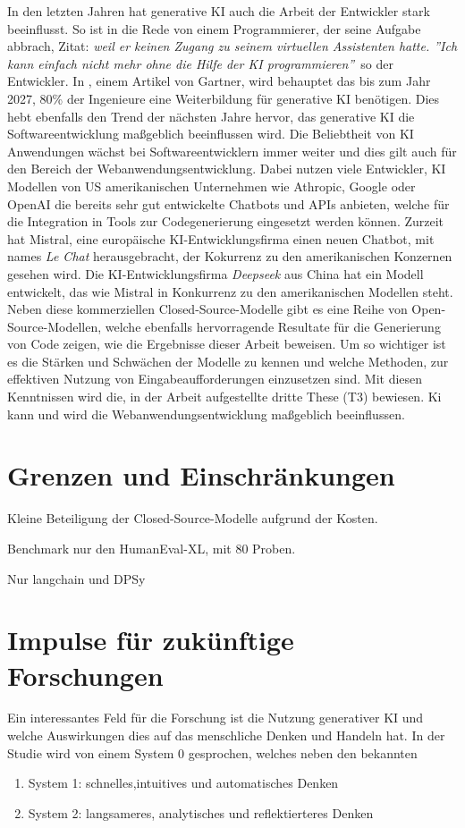 In den letzten Jahren hat generative KI auch die Arbeit der Entwickler stark beeinflusst. So ist in \cite{focus-online-2025} die Rede von einem Programmierer, der seine Aufgabe abbrach, Zitat: \glqq \textit{weil er keinen Zugang zu seinem virtuellen Assistenten hatte. ''Ich kann einfach nicht mehr ohne die Hilfe der KI programmieren''}\grqq \ so der Entwickler. In \cite{company_gartner_2024}, einem Artikel von Gartner, wird behauptet das bis zum Jahr 2027, 80\% der Ingenieure eine Weiterbildung für generative KI benötigen. Dies hebt ebenfalls den Trend der nächsten Jahre hervor, das generative KI die Softwareentwicklung maßgeblich beeinflussen wird.
Die Beliebtheit von KI Anwendungen wächst bei Softwareentwicklern immer weiter und dies gilt auch für den Bereich der Webanwendungsentwicklung. Dabei nutzen viele Entwickler, KI Modellen von US amerikanischen Unternehmen wie Athropic, Google oder OpenAI die bereits sehr gut entwickelte Chatbots und APIs anbieten, welche für die Integration in Tools zur Codegenerierung eingesetzt werden können. Zurzeit hat Mistral, eine europäische KI-Entwicklungsfirma einen neuen Chatbot, mit names \textit{Le Chat} herausgebracht, der Kokurrenz zu den amerikanischen Konzernen gesehen wird. Die KI-Entwicklungsfirma \textit{Deepseek} aus China hat ein Modell entwickelt, das wie Mistral in Konkurrenz zu den amerikanischen Modellen steht. Neben diese kommerziellen Closed-Source-Modelle gibt es eine Reihe von Open-Source-Modellen, welche ebenfalls hervorragende Resultate für die Generierung von Code zeigen, wie die Ergebnisse dieser Arbeit beweisen. Um so wichtiger ist es die Stärken und Schwächen der Modelle zu kennen und welche Methoden, zur effektiven Nutzung von Eingabeaufforderungen einzusetzen sind. Mit diesen Kenntnissen wird die, in der Arbeit aufgestellte dritte These (T3) bewiesen. Ki kann und wird die Webanwendungsentwicklung maßgeblich beeinflussen. 

\section{Grenzen und Einschränkungen}
Kleine Beteiligung der Closed-Source-Modelle aufgrund der Kosten.

Benchmark nur den HumanEval-XL, mit 80 Proben.

Nur langchain und DPSy

\section{Impulse für zukünftige Forschungen}
Ein interessantes Feld für die Forschung ist die Nutzung generativer KI und welche Auswirkungen dies auf das menschliche Denken und Handeln hat. In der Studie \cite{chiriatti-2024} wird von einem System 0 gesprochen, welches neben den bekannten 
\begin{enumerate}
	\item System 1: schnelles,intuitives und automatisches Denken
	\item System 2: langsameres, analytisches und reflektierteres Denken
\end{enumerate}


